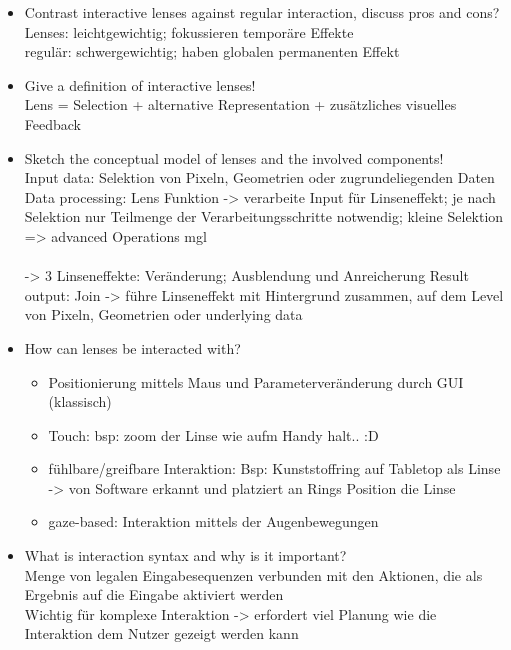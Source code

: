 \begin{itemize}
	\item Contrast interactive lenses against regular interaction, discuss pros and cons?\\
	Lenses: leichtgewichtig; fokussieren temporäre Effekte\\
	regulär: schwergewichtig; haben globalen permanenten Effekt\\
	
	\item Give a definition of interactive lenses!\\
	Lens = Selection + alternative Representation + zusätzliches visuelles Feedback
	
	\item Sketch the conceptual model of lenses and the involved components!\\
	Input data: Selektion von Pixeln, Geometrien oder zugrundeliegenden Daten \\
	Data processing: Lens Funktion -> verarbeite Input für Linseneffekt; je nach Selektion nur Teilmenge der Verarbeitungsschritte notwendig; kleine Selektion => advanced Operations mgl\\\\
	-> 3 Linseneffekte: Veränderung; Ausblendung und Anreicherung
	Result output: Join -> führe Linseneffekt mit Hintergrund zusammen, auf dem Level von Pixeln, Geometrien oder underlying data
	
	\item How can lenses be interacted with?
	\begin{itemize}
		\item Positionierung mittels Maus und Parameterveränderung durch GUI (klassisch)
		\item Touch: bsp: zoom der Linse wie aufm Handy halt.. :D
		\item fühlbare/greifbare Interaktion: Bsp: Kunststoffring auf Tabletop als Linse -> von Software erkannt und platziert an Rings Position die Linse
		\item gaze-based: Interaktion mittels der Augenbewegungen
	\end{itemize}
	
	\item What is interaction syntax and why is it important?\\
	Menge von legalen Eingabesequenzen verbunden mit den Aktionen, die als Ergebnis auf die Eingabe aktiviert werden\\
	Wichtig für komplexe Interaktion -> erfordert viel Planung wie die Interaktion dem Nutzer gezeigt werden kann
	

\end{itemize}
